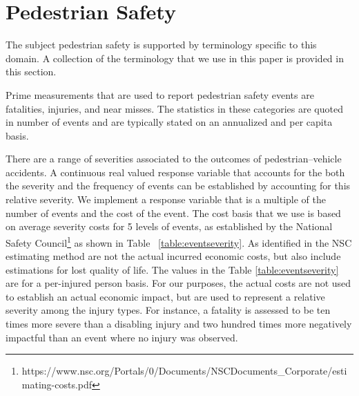 \documentclass{llncs}
\begin{document}
\section{Pedestrian Safety}
%
The subject pedestrian safety is supported by terminology specific to this domain. A collection of the terminology that we use in this paper is provided in this section. 

Prime measurements that are used to report pedestrian safety events are fatalities, injuries, and near misses. The statistics in these categories are quoted in number of events and are typically stated on an annualized and per capita basis.

There are a range of severities associated to the outcomes of pedestrian--vehicle accidents. A continuous real valued response variable that accounts for the both the severity and the frequency of events can be established by accounting for this relative severity. We implement a response variable that is a multiple of the number of events and the cost of the event. The cost basis that we use is based on average severity costs for 5 levels of events, as established by the National Safety Council\footnote{https://www.nsc.org/Portals/0/Documents/NSCDocuments_Corporate/estimating-costs.pdf} as shown in Table ~\ref{table:eventseverity}. As identified in the NSC estimating method are not the actual incurred economic costs, but also include estimations for lost quality of life. The values in the Table \ref{table:eventseverity} are for a per-injured person basis. For our purposes, the actual costs are not used to establish an actual economic impact, but are used to represent a relative severity among the injury types. For instance, a fatality is assessed to be ten times more severe than a disabling injury and two hundred times more negatively impactful than an event where no injury was observed.
\end{document}
